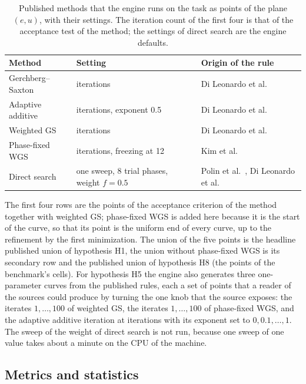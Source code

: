 \begin{table}[t]
\centering\small
\caption{Published methods that the engine runs on the task as points of the plane $(e,u)$, with their settings. The iteration count of the first four is that of the acceptance test of the method; the settings of direct search are the engine defaults.}
\label{tab:methods}
\begin{tabular}{@{}p{4.2cm} p{4.4cm} p{5.4cm}@{}}
\toprule
Method & Setting & Origin of the rule\\
\midrule
Gerchberg--Saxton & \baseIters{} iterations & Di Leonardo et al.~\cite{dileonardo}\\
Adaptive additive & \baseIters{} iterations, exponent 0.5 & Di Leonardo et al.~\cite{dileonardo}\\
Weighted GS & \baseIters{} iterations & Di Leonardo et al.~\cite{dileonardo}\\
Phase-fixed WGS & \baseIters{} iterations, freezing at 12 & Kim et al.~\cite{kim2019}\\
Direct search & one sweep, 8 trial phases, weight $f=0.5$ & Polin et al.~\cite{polin}, Di Leonardo et al.~\cite{dileonardo}\\
\bottomrule
\end{tabular}
\end{table}

The first four rows are the points of the acceptance criterion of the method together with weighted GS; phase-fixed WGS is added here because it is the start of the curve, so that its point is the uniform end of every curve, up to the refinement by the first minimization. The union of the five points is the headline published union of hypothesis H1, the union without phase-fixed WGS is its secondary row and the published union of hypothesis H8 (the points of the benchmark's cells).
For hypothesis H5 the engine also generates three one-parameter curves from the published rules, each a set of points that a reader of the sources could produce by turning the one knob that the source exposes: the iterates $1,\dots,100$ of weighted GS, the iterates $1,\dots,100$ of phase-fixed WGS, and the adaptive additive iteration at \baseIters{} iterations with its exponent set to $0,0.1,\dots,1$. The sweep of the weight of direct search is not run, because one sweep of one value takes about a minute on the CPU of the machine.

\subsection{Metrics and statistics}\label{sec:metrics}

